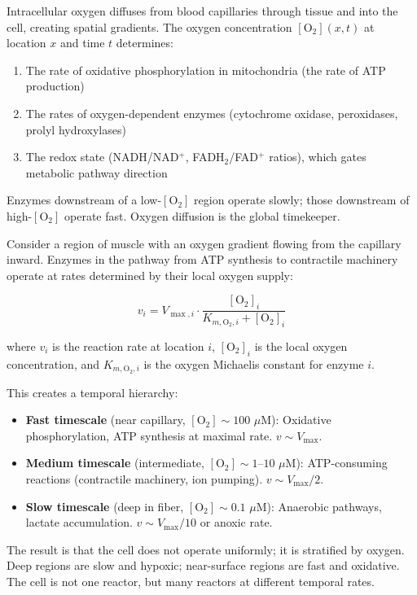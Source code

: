\begin{principle}
\label{prin:oxygen-clock}
Intracellular oxygen diffuses from blood capillaries through tissue and into the cell, creating spatial gradients. The oxygen concentration $[\text{O}_2](x,t)$ at location $x$ and time $t$ determines:
\begin{enumerate}[label=(\roman*), noitemsep]
\item The rate of oxidative phosphorylation in mitochondria (the rate of ATP production)
\item The rates of oxygen-dependent enzymes (cytochrome oxidase, peroxidases, prolyl hydroxylases)
\item The redox state (NADH/NAD$^+$, FADH$_2$/FAD$^+$ ratios), which gates metabolic pathway direction
\end{enumerate}

Enzymes downstream of a low-$[\text{O}_2]$ region operate slowly; those downstream of high-$[\text{O}_2]$ operate fast. Oxygen diffusion is the global timekeeper.
\end{principle}

\begin{theorem}
\label{thm:oxygen-hierarchy}
Consider a region of muscle with an oxygen gradient flowing from the capillary inward. Enzymes in the pathway from ATP synthesis to contractile machinery operate at rates determined by their local oxygen supply:

\begin{equation}
  v_i = V_{\max,i} \cdot \frac{[\text{O}_2]_i}{K_{m,\text{O}_2,i} + [\text{O}_2]_i}
\end{equation}

where $v_i$ is the reaction rate at location $i$, $[\text{O}_2]_i$ is the local oxygen concentration, and $K_{m,\text{O}_2,i}$ is the oxygen Michaelis constant for enzyme $i$.

This creates a temporal hierarchy:
\begin{itemize}[noitemsep]
\item \textbf{Fast timescale} (near capillary, $[\text{O}_2]\sim 100$ $\mu$M): Oxidative phosphorylation, ATP synthesis at maximal rate. $v \sim V_{\max}$.
\item \textbf{Medium timescale} (intermediate, $[\text{O}_2]\sim 1$--$10$ $\mu$M): ATP-consuming reactions (contractile machinery, ion pumping). $v \sim V_{\max}/2$.
\item \textbf{Slow timescale} (deep in fiber, $[\text{O}_2]\sim 0.1$ $\mu$M): Anaerobic pathways, lactate accumulation. $v \sim V_{\max}/10$ or anoxic rate.
\end{itemize}

The result is that the cell does not operate uniformly; it is stratified by oxygen. Deep regions are slow and hypoxic; near-surface regions are fast and oxidative. The cell is not one reactor, but many reactors at different temporal rates.
\end{theorem}

